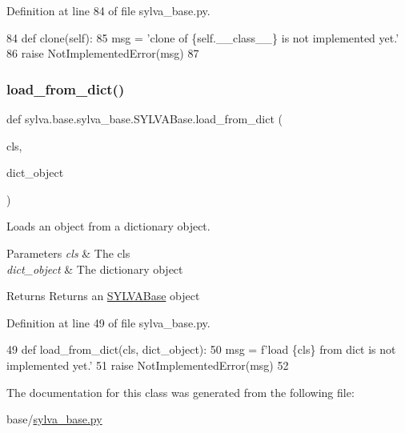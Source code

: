 Definition at line 84 of file sylva\+\_\+base.\+py.


\begin{DoxyCode}
84     \textcolor{keyword}{def }clone(self):
85         msg = \textcolor{stringliteral}{'clone of \{self.\_\_class\_\_\} is not implemented yet.'}
86         \textcolor{keywordflow}{raise} NotImplementedError(msg)
87 \end{DoxyCode}
\mbox{\label{classsylva_1_1base_1_1sylva__base_1_1_s_y_l_v_a_base_a4acd68307f4b2bef6082b86f3ff6ce3a}} 
\subsubsection{\texorpdfstring{load\+\_\+from\+\_\+dict()}{load\_from\_dict()}}
{\footnotesize\ttfamily def sylva.\+base.\+sylva\+\_\+base.\+S\+Y\+L\+V\+A\+Base.\+load\+\_\+from\+\_\+dict (\begin{DoxyParamCaption}\item[{}]{cls,  }\item[{}]{dict\+\_\+object }\end{DoxyParamCaption})}



Loads an object from a dictionary object. 


\begin{DoxyParams}{Parameters}
{\em cls} & The cls \\
\hline
{\em dict\+\_\+object} & The dictionary object\\
\hline
\end{DoxyParams}
\begin{DoxyReturn}{Returns}
Returns an \hyperlink{classsylva_1_1base_1_1sylva__base_1_1_s_y_l_v_a_base}{S\+Y\+L\+V\+A\+Base} object 
\end{DoxyReturn}


Definition at line 49 of file sylva\+\_\+base.\+py.


\begin{DoxyCode}
49     \textcolor{keyword}{def }load\_from\_dict(cls, dict\_object):
50         msg = f\textcolor{stringliteral}{'load \{cls\} from dict is not implemented yet.'}
51         \textcolor{keywordflow}{raise} NotImplementedError(msg)
52 
\end{DoxyCode}


The documentation for this class was generated from the following file\+:\begin{DoxyCompactItemize}
\item 
base/\hyperlink{sylva__base_8py}{sylva\+\_\+base.\+py}\end{DoxyCompactItemize}
